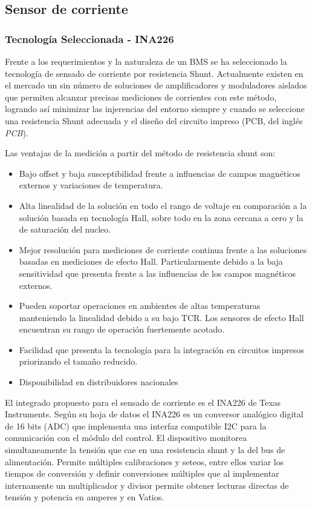 \documentclass[10pt,a4paper]{article}
\begin{document}
\subsection{Sensor de corriente}

\subsubsection{Tecnología Seleccionada - INA226}

Frente a los requerimientos y la naturaleza de un \acrshort{BMS} se ha
seleccionado la tecnología de sensado de corriente por resistencia Shunt.
Actualmente existen en el mercado un sin número de soluciones de amplificadores
y moduladores aislados que permiten alcanzar precisas mediciones de corrientes
con este método, logrando as\'i minimizar las injerencias del entorno siempre 
y cuando se seleccione una resistencia Shunt adecuada y el diseño del circuito
impreso (\acrshort{PCB}, del ingl\'es \emph{\acrlong{PCB}}).

\noindent Las ventajas de la medición a partir del método de resistencia 
shunt son:

\begin{itemize}
    \item Bajo offset y baja susceptibilidad frente a influencias de campos 
	magnéticos externos y variaciones de temperatura.
    \item Alta linealidad de la solución en todo el rango de voltaje en 
	comparación a la solución basada en tecnología Hall, sobre todo en 
	la zona cercana a cero y la de saturación del nucleo. 
    \item Mejor resolución para mediciones de corriente continua frente a 
	las soluciones basadas en mediciones de efecto Hall. 
	Particularmente debido a la baja sensitividad que presenta frente a 
	las influencias de los campos magnéticos externos.
    \item Pueden soportar operaciones en ambientes de altas temperaturas 
	manteniendo la linealidad debido a su bajo TCR. 
	Los sensores de efecto Hall encuentran su rango de operación 
	fuertemente acotado.
    \item Facilidad que presenta la tecnología para la integración en 
	circuitos impresos priorizando el tamaño reducido.
    \item Disponibilidad en distribuidores nacionales
\end{itemize}

\noindent El integrado propuesto para el sensado de corriente es el INA226 de
Texas Instruments. Seg\'un su hoja de datos \cite{ina226} el INA226 es un 
conversor analógico digital de 16 bits (ADC) que implementa una interfaz 
compatible I2C para la comunicación con el módulo del control. El dispositivo 
monitorea simultaneamente la tensión que cae en una resistencia shunt y la del 
bus de alimentación. Permite múltiples calibraciones y seteos, entre ellos 
variar los tiempos de conversión y definir conversiones múltiples que al 
implementar internamente un multiplicador y divisor permite obtener lecturas 
directas de tensión y potencia en amperes y en Vatios.
\end{document}
